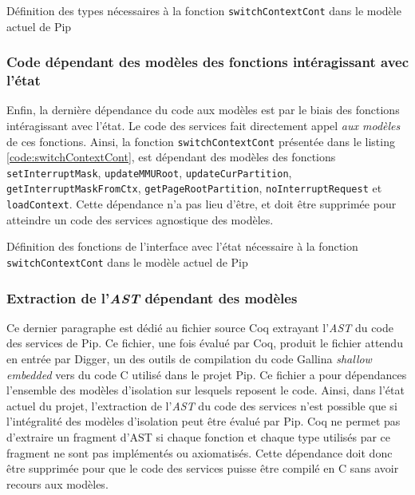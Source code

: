 			\begin{listing}[!ht]
				\caption{Définition des types nécessaires à la fonction \texttt{switchContextCont} dans le modèle actuel de Pip}
				\label{code:CurrentTypesModel}
			\end{listing}

			\subsubsection{Code dépendant des modèles des fonctions intéragissant avec l'état}
			Enfin, la dernière dépendance du code aux modèles est par le biais des fonctions intéragissant avec l'état. Le code des services fait directement appel \emph{aux modèles} de ces fonctions. Ainsi, la fonction \texttt{switchContextCont} présentée dans le listing \ref{code:switchContextCont}, est dépendant des modèles des fonctions \texttt{setInterruptMask}, \texttt{updateMMURoot}, \texttt{updateCurPartition}, \texttt{getInterruptMaskFromCtx}, \texttt{getPageRootPartition}, \texttt{noInterruptRequest} et \texttt{loadContext}. Cette dépendance n'a pas lieu d'être, et doit être supprimée pour atteindre un code des services agnostique des modèles.

			\begin{listing}[!ht]
				\caption{Définition des fonctions de l'interface avec l'état nécessaire à la fonction \texttt{switchContextCont} dans le modèle actuel de Pip}
				\label{code:CurrentFunctionsModel}
			\end{listing}

			\subsubsection{Extraction de l'\emph{AST} dépendant des modèles}
			\label{sec:AST_extr}
			Ce dernier paragraphe est dédié au fichier source Coq extrayant l'\emph{AST} du code des services de Pip. Ce fichier, une fois évalué par Coq, produit le fichier attendu en entrée par Digger, un des outils de compilation du code Gallina \emph{shallow embedded} vers du code C utilisé dans le projet Pip. Ce fichier a pour dépendances l'ensemble des modèles d'isolation sur lesquels reposent le code. Ainsi, dans l'état actuel du projet, l'extraction de l'\emph{AST} du code des services n'est possible que si l'intégralité des modèles d'isolation peut être évalué par Pip. Coq ne permet pas d'extraire un fragment d'AST si chaque fonction et chaque type utilisés par ce fragment ne sont pas implémentés ou axiomatisés. Cette dépendance doit donc être supprimée pour que le code des services puisse être compilé en C sans avoir recours aux modèles.


